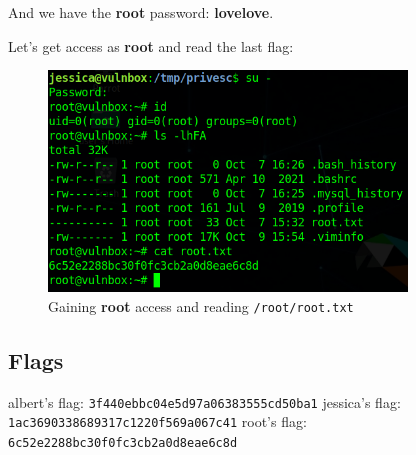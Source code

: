 \documentclass[12pt]{article}
\begin{document}
    And we have the \textbf{root} password: \textbf{lovelove}.

    Let's get access as \textbf{root} and read the last flag:

    \begin{figure}[H]\label{pic:71-root}
        \centering
        \includegraphics[width=0.85\textwidth]{71-root.png}
        \caption{Gaining \textbf{root} access and reading \texttt{/root/root.txt}}
    \end{figure}


\subsection{Flags}

    albert's flag: 
    \newline
    {\centering\color{Purple}
    \verb!3f440ebbc04e5d97a06383555cd50ba1!
    }
    \newline
    jessica's flag: 
    \newline
    {\centering\color{Purple}
    \verb!1ac3690338689317c1220f569a067c41!
    }
    \newline
    root's flag: 
    \newline
    {\centering\color{Purple}
    \verb!6c52e2288bc30f0fc3cb2a0d8eae6c8d!
    }
\end{document}
